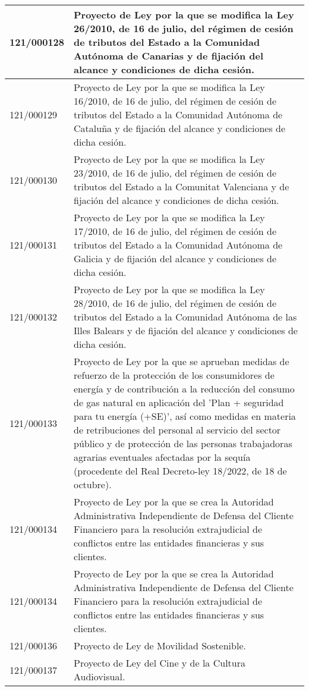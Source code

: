 {\begin{table}[H]
\begin{center}
\begin{tabularx}{\linewidth}{| l | X |}
\hline
121/000128 & Proyecto de Ley por la que se modifica la Ley 26/2010, de 16 de julio, del régimen de cesión de tributos del Estado a la Comunidad Autónoma de Canarias y de fijación del alcance y condiciones de dicha cesión. \\
\hline
121/000129 & Proyecto de Ley por la que se modifica la Ley 16/2010, de 16 de julio, del régimen de cesión de tributos del Estado a la Comunidad Autónoma de Cataluña y de fijación del alcance y condiciones de dicha cesión. \\
\hline
121/000130 & Proyecto de Ley por la que se modifica la Ley 23/2010, de 16 de julio, del régimen de cesión de tributos del Estado a la Comunitat Valenciana y de fijación del alcance y condiciones de dicha cesión. \\
\hline
121/000131 & Proyecto de Ley por la que se modifica la Ley 17/2010, de 16 de julio, del régimen de cesión de tributos del Estado a la Comunidad Autónoma de Galicia y de fijación del alcance y condiciones de dicha cesión. \\
\hline
121/000132 & Proyecto de Ley por la que se modifica la Ley 28/2010, de 16 de julio, del régimen de cesión de tributos del Estado a la Comunidad Autónoma de las Illes Balears y de fijación del alcance y condiciones de dicha cesión. \\
\hline
121/000133 & Proyecto de Ley por la que se aprueban medidas de refuerzo de la protección de los consumidores de energía y de contribución a la reducción del consumo de gas natural en aplicación del 'Plan + seguridad para tu energía (+SE)', así como medidas en materia de retribuciones del personal al servicio del sector público y de protección de las personas trabajadoras agrarias eventuales afectadas por la sequía (procedente del Real Decreto-ley 18/2022, de 18 de octubre). \\
\hline
121/000134 & Proyecto de Ley por la que se crea la Autoridad Administrativa Independiente de Defensa del Cliente Financiero para la resolución extrajudicial de conflictos entre las entidades financieras y sus clientes. \\
\hline
121/000134 & Proyecto de Ley por la que se crea la Autoridad Administrativa Independiente de Defensa del Cliente Financiero para la resolución extrajudicial de conflictos entre las entidades financieras y sus clientes. \\
\hline
121/000136 & Proyecto de Ley de Movilidad Sostenible. \\
\hline
121/000137 & Proyecto de Ley del Cine y de la Cultura Audiovisual. \\

\end{tabularx}
\end{center}
\end{table}}
